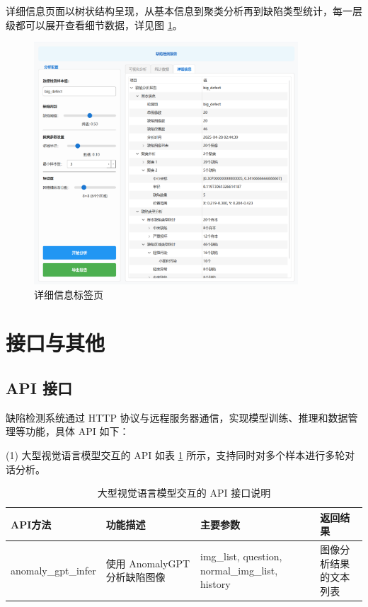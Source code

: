 \documentclass[
  ]{njuthesis}
\begin{document}
详细信息页面以树状结构呈现，从基本信息到聚类分析再到缺陷类型统计，每一层级都可以展开查看细节数据，详见图 \ref{详细信息标签页}。

\begin{figure}[H]
    \centering
    \includegraphics[width=0.88\textwidth]{images/详细信息标签页.png}
    \caption{详细信息标签页}
    \label{详细信息标签页}
\end{figure}

\section{接口与其他}

\subsection{API 接口}

缺陷检测系统通过 HTTP 协议与远程服务器通信，实现模型训练、推理和数据管理等功能，具体 API 如下：

(1) 大型视觉语言模型交互的 API 如表 \ref{AI_API} 所示，支持同时对多个样本进行多轮对话分析。

\begin{table}[H]
    \centering
    \caption{大型视觉语言模型交互的 API 接口说明}
    \label{AI_API}
    \renewcommand\arraystretch{0.8}
    \begin{tabular}{p{2.5cm}p{3.5cm}p{4cm}p{2.5cm}}
    \toprule
    API方法 & 功能描述 & 主要参数 & 返回结果 \\
    \midrule
    anomaly\_gpt\_infer & 使用 AnomalyGPT 分析缺陷图像 & img\_list, question, normal\_img\_list, history & 图像分析结果的文本列表 \\
    \bottomrule
    \end{tabular}
\end{table}
\end{document}
